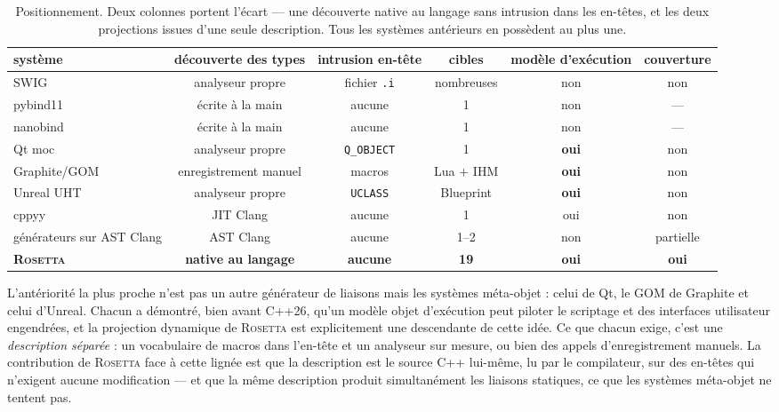 \documentclass[11pt,a4paper]{article}
\newcommand{\rosetta}{\textsc{Rosetta}}
\newcommand{\code}[1]{\texttt{\small #1}}
\begin{document}
\begin{table}[h]
\centering\footnotesize
\begin{tabular}{lccccc}
\toprule
système & découverte des types & intrusion en-tête & cibles & modèle d'exécution & couverture \\
\midrule
SWIG~\cite{swig}            & analyseur propre    & fichier \code{.i} & nombreuses & non & non \\
pybind11~\cite{pybind11}    & écrite à la main    & aucune & 1 & non & --- \\
nanobind~\cite{nanobind}    & écrite à la main    & aucune & 1 & non & --- \\
Qt moc~\cite{qt}            & analyseur propre    & \code{Q\_OBJECT} & 1 & \textbf{oui} & non \\
Graphite/GOM~\cite{graphite}& enregistrement manuel & macros & Lua $+$ IHM & \textbf{oui} & non \\
Unreal UHT~\cite{unreal}    & analyseur propre    & \code{UCLASS} & Blueprint & \textbf{oui} & non \\
cppyy~\cite{cppyy}          & JIT Clang           & aucune & 1 & oui & non \\
générateurs sur AST Clang   & AST Clang           & aucune & 1--2 & non & partielle \\
\midrule
\textbf{\rosetta}           & \textbf{native au langage} & \textbf{aucune} & \textbf{19} & \textbf{oui} & \textbf{oui} \\
\bottomrule
\end{tabular}
\caption{Positionnement. Deux colonnes portent l'écart --- une découverte native
au langage sans intrusion dans les en-têtes, et les deux projections issues d'une
seule description. Tous les systèmes antérieurs en possèdent au plus une.}
\label{tab:related}
\end{table}

L'antériorité la plus proche n'est pas un autre générateur de liaisons mais les
systèmes méta-objet : celui de Qt, le GOM de Graphite et celui d'Unreal. Chacun a
démontré, bien avant C++26, qu'un modèle objet d'exécution peut piloter le
scriptage et des interfaces utilisateur engendrées, et la projection dynamique de
\rosetta{} est explicitement une descendante de cette idée. Ce que chacun exige,
c'est une \emph{description séparée} : un vocabulaire de macros dans l'en-tête
et un analyseur sur mesure, ou bien des appels d'enregistrement manuels. La
contribution de \rosetta{} face à cette lignée est que la description est le
source C++ lui-même, lu par le compilateur, sur des en-têtes qui n'exigent aucune
modification --- et que la même description produit simultanément les liaisons
statiques, ce que les systèmes méta-objet ne tentent pas.
\end{document}

